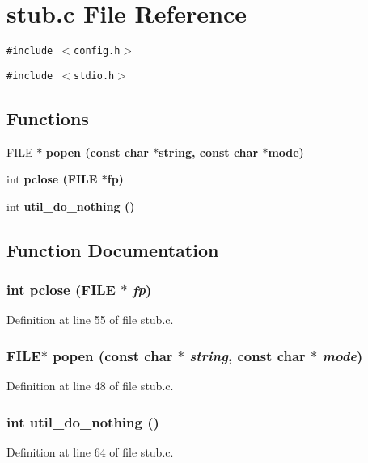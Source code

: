 \section{stub.c File Reference}
\label{stub_8c}
{\tt \#include $<$config.h$>$}\par
{\tt \#include $<$stdio.h$>$}\par
\subsection*{Functions}
\begin{CompactItemize}
\item 
FILE $\ast$ \bf{popen} (const char $\ast$string, const char $\ast$mode)
\item 
int \bf{pclose} (FILE $\ast$fp)
\item 
int \bf{util\_\-do\_\-nothing} ()
\end{CompactItemize}


\subsection{Function Documentation}
\subsubsection{\setlength{\rightskip}{0pt plus 5cm}int pclose (FILE $\ast$ {\em fp})}\label{stub_8c_bca9eaf3eb5f2010062ee8f6a4017733}




Definition at line 55 of file stub.c.
\subsubsection{\setlength{\rightskip}{0pt plus 5cm}FILE$\ast$ popen (const char $\ast$ {\em string}, const char $\ast$ {\em mode})}\label{stub_8c_0009f5826aafed40431af188cd771226}




Definition at line 48 of file stub.c.
\subsubsection{\setlength{\rightskip}{0pt plus 5cm}int util\_\-do\_\-nothing ()}\label{stub_8c_73725e00edb9506dd96aadc23e76afc2}




Definition at line 64 of file stub.c.